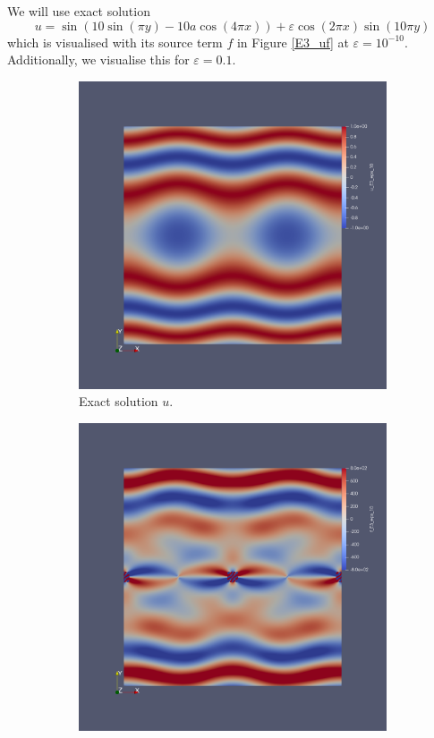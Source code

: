 \documentclass[12pt]{ociamthesis}
\begin{document}
We will use exact solution
\begin{equation}
u = \sin(10\sin(\pi y)-10a\cos(4 \pi x)) + \varepsilon \cos(2 \pi x)\sin(10 \pi y)
\end{equation}
which is visualised with its source term $f$ in Figure \ref{E3_uf} at $\varepsilon = 10^{-10}$. Additionally, we visualise this for $\varepsilon = 0.1$.
\begin{figure}[H]
 \begin{subfigure}{0.5\textwidth} \label{E3_u}
     \includegraphics[width=\textwidth]{Pics/uf/U_E3_eps_10.png}
     \caption{Exact solution $u$.}
 \end{subfigure}
   \begin{subfigure}{0.5\textwidth}
     \includegraphics[width=\textwidth]{Pics/uf/F_E3_eps_10.png}

\end{subfigure}
\end{figure}
\end{document}
